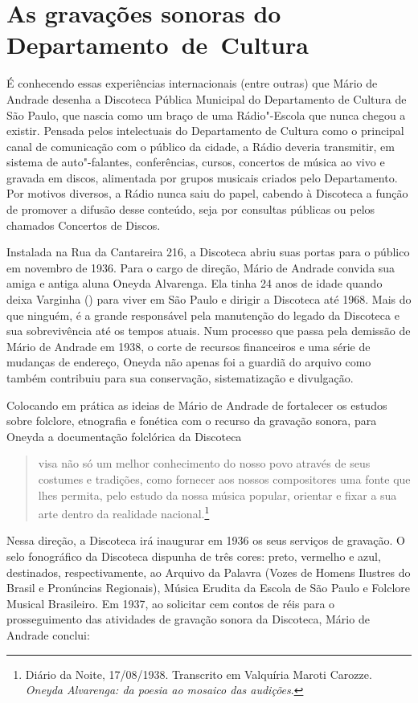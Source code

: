 \section*{As gravações sonoras do Departamento~de~Cultura}

É conhecendo essas experiências internacionais (entre outras) que Mário
de Andrade desenha a Discoteca Pública Municipal do Departamento de
Cultura de São Paulo, que nascia como um braço de uma Rádio"-Escola que
nunca chegou a existir. Pensada pelos intelectuais do Departamento de
Cultura como o principal canal de comunicação com o público da cidade, a
Rádio deveria transmitir, em sistema de auto"-falantes, conferências,
cursos, concertos de música ao vivo e gravada em discos, alimentada por
grupos musicais criados pelo Departamento. Por motivos diversos, a Rádio
nunca saiu do papel, cabendo à Discoteca a função de promover a difusão
desse conteúdo, seja por consultas públicas ou pelos chamados Concertos
de Discos.

Instalada na Rua da Cantareira 216, a Discoteca abriu suas portas para o
público em novembro de 1936. Para o cargo de direção, Mário de Andrade
convida sua amiga e antiga aluna Oneyda Alvarenga. Ela tinha 24 anos de
idade quando deixa Varginha () para viver em São Paulo e dirigir a
Discoteca até 1968. Mais do que ninguém, é a grande responsável pela
manutenção do legado da Discoteca e sua sobrevivência até os tempos
atuais. Num processo que passa pela demissão de Mário de Andrade em
1938, o corte de recursos financeiros e uma série de mudanças de
endereço, Oneyda não apenas foi a guardiã do arquivo como também
contribuiu para sua conservação, sistematização e divulgação.

Colocando em prática as ideias de Mário de Andrade de fortalecer os
estudos sobre folclore, etnografia e fonética com o recurso da gravação
sonora, para Oneyda a documentação folclórica da Discoteca

\begin{quote}
visa não só um melhor conhecimento do nosso povo através de seus
costumes e tradições, como fornecer aos nossos compositores uma fonte
que lhes permita, pelo estudo da nossa música popular, orientar e fixar
a sua arte dentro da realidade nacional.\footnote{Diário da Noite,
  17/08/1938. Transcrito em Valquíria Maroti Carozze. \emph{Oneyda
  Alvarenga: da poesia ao mosaico das audições}.}
\end{quote}

Nessa direção, a Discoteca irá inaugurar em 1936 os seus serviços de
gravação. O selo fonográfico da Discoteca dispunha de três cores: preto,
vermelho e azul, destinados, respectivamente, ao Arquivo da Palavra
(Vozes de Homens Ilustres do Brasil e Pronúncias Regionais), Música
Erudita da Escola de São Paulo e Folclore Musical Brasileiro. Em 1937,
ao solicitar cem contos de réis para o prosseguimento das atividades de
gravação sonora da Discoteca, Mário de Andrade conclui:

